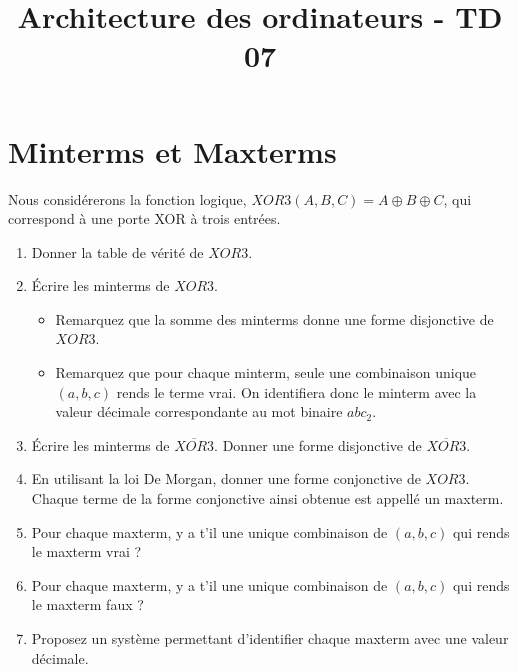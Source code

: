 \documentclass[a4paper,10pt]{exam}
\title{Architecture des ordinateurs - TD 07}
\author{}
\date{}
\begin{document}
\maketitle

\section{Minterms et Maxterms}
Nous considérerons la fonction logique, $XOR3(A,B,C) = A \oplus B \oplus C$, qui correspond à une porte XOR à trois entrées.
\begin{enumerate}
  \item Donner la table de vérité de $XOR3$.
  \item Écrire les minterms de $XOR3$. 
      \begin{itemize}
        \item Remarquez que la somme des minterms donne une forme disjonctive de $XOR3$.
        \item Remarquez que pour chaque minterm, seule une combinaison unique $(a,b,c)$ rends le terme vrai.
              On identifiera donc le minterm avec la valeur décimale correspondante au mot binaire $abc_2$.
      \end{itemize}
  \item Écrire les minterms de $\overline{XOR3}$. Donner une forme disjonctive de $\overline{XOR3}$.
  \item En utilisant la loi De Morgan, donner une forme conjonctive de $XOR3$. Chaque terme de la forme conjonctive ainsi obtenue est appellé un maxterm. 
  \item Pour chaque maxterm, y a t'il une unique combinaison de $(a,b,c)$ qui rends le maxterm vrai ? 
  \item Pour chaque maxterm, y a t'il une unique combinaison de $(a,b,c)$ qui rends le maxterm faux ? 
  \item Proposez un système permettant d'identifier chaque maxterm avec une valeur décimale. 
\end{enumerate}
\end{document}
